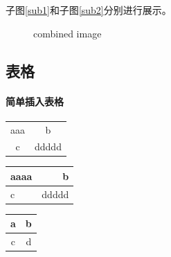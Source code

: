 \documentclass[a4paper,10 pt, conference]{article}     %
\begin{document}
  子图\ref{sub1}和子图\ref{sub2}分别进行展示。
    \begin{figure}[!htbp]
      \centering
      \qquad
      \caption{combined image}\label{img-together}
    \end{figure}

    \subsection{表格}
    \paragraph{简单插入表格}

    \begin{tabular}{|c|c|}
     aaa & b \\
     c & ddddd\\
   \end{tabular}

    \begin{tabular}{|l|r|}
     \hline
     aaaa & b \\
     \hline
     c & ddddd\\
     \hline
   \end{tabular}

   \begin{center}
     \begin{tabular}{|c|c|}
       \hline
       a & b \\ \hline
       c & d\\
       \hline
     \end{tabular}
   \end{center}
\end{document}
